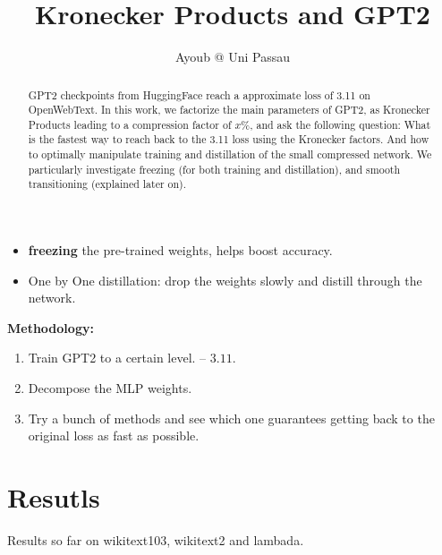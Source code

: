 \documentclass{article}
\title{Kronecker Products and GPT2}
\author{Ayoub @ Uni Passau}
\begin{document}
\maketitle

\begin{abstract}

	GPT2 checkpoints from HuggingFace reach a approximate loss of 3.11 on OpenWebText. 	In this work, we factorize the main parameters of GPT2, as Kronecker Products leading to a compression factor of $x\%$, and ask the following question:  What is the fastest way to reach back to the 3.11 loss using the Kronecker factors. And how to optimally manipulate training and distillation of the small compressed network. We particularly investigate freezing (for both training and distillation), and smooth transitioning (explained later on).


\end{abstract}

\begin{itemize}
	\item \textbf{freezing} the pre-trained weights, helps boost accuracy.
	\item One by One distillation: drop the weights slowly and distill through the network.
\end{itemize}

\textbf{Methodology:}
\begin{enumerate}
	\item Train GPT2 to a certain level. -- $3.11$.
	\item Decompose the MLP weights.
	\item Try a bunch of methods and see which one guarantees getting back to the original loss as fast as possible.
\end{enumerate}

\tableofcontents
\newpage

\section{Resutls}%
\label{sec:Resutls}

Results so far on wikitext103, wikitext2 and lambada. 
\end{document}

